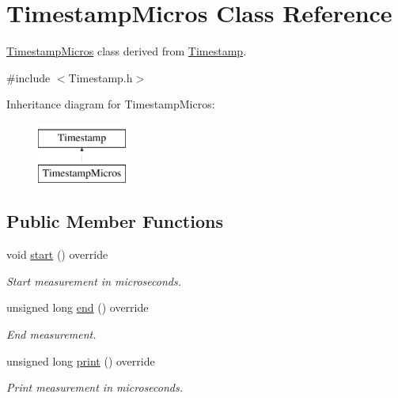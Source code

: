 \hypertarget{class_timestamp_micros}{}\section{Timestamp\+Micros Class Reference}
\label{class_timestamp_micros}


\hyperlink{class_timestamp_micros}{Timestamp\+Micros} class derived from \hyperlink{class_timestamp}{Timestamp}.  




{\ttfamily \#include $<$Timestamp.\+h$>$}

Inheritance diagram for Timestamp\+Micros\+:\begin{figure}[H]
\begin{center}
\leavevmode
\includegraphics[height=2.000000cm]{class_timestamp_micros}
\end{center}
\end{figure}
\subsection*{Public Member Functions}
\begin{DoxyCompactItemize}
\item 
void \hyperlink{class_timestamp_micros_a847c7bc584b217cc901b22c1e08b013e}{start} () override\hypertarget{class_timestamp_micros_a847c7bc584b217cc901b22c1e08b013e}{}\label{class_timestamp_micros_a847c7bc584b217cc901b22c1e08b013e}

\begin{DoxyCompactList}\small\item\em Start measurement in microseconds. \end{DoxyCompactList}\item 
unsigned long \hyperlink{class_timestamp_micros_a17b22ddd75040a343cd8c8331228d3b9}{end} () override
\begin{DoxyCompactList}\small\item\em End measurement. \end{DoxyCompactList}\item 
unsigned long \hyperlink{class_timestamp_micros_a2fd08e9267a063b5b3e702c3dde87366}{print} () override
\begin{DoxyCompactList}\small\item\em Print measurement in microseconds. \end{DoxyCompactList}\end{DoxyCompactItemize}


